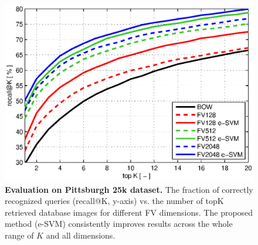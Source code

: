 \documentclass[table]{article} %
\begin{document}
    \begin{figure}[t!]
        \centering
        \includegraphics[width=\linewidth]{imgs/plotPitt25k}    
        \caption{
            \textbf{Evaluation on Pittsburgh 25k \cite{Gronat13} dataset.} The fraction of correctly recognized queries (recall@K, y-axis) vs. the number of topK retrieved database images for different FV dimensions. The proposed method (e-SVM) consistently improves results across the whole range of $K$  and all dimensions.
        }
        \label{fig:recall}
    \end{figure}

\end{document}
